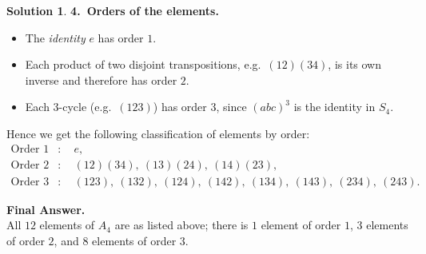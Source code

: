 \documentclass[12pt]{article}
\theoremstyle{definition} %
\newtheorem{solution}{Solution}
\theoremstyle{plain} %
\begin{document}
\begin{solution}
    \bigskip
    
    \noindent
    \textbf{4.\ Orders of the elements.}
    \begin{itemize}
    \item The \emph{identity} $e$ has order $1$.
    \item Each product of two disjoint transpositions, e.g.\ $(12)(34)$, is its own inverse and therefore has order $2$.
    \item Each 3-cycle (e.g.\ $(123)$) has order $3$, since $(abc)^3$ is the identity in $S_4$.
    \end{itemize}
    
    \noindent
    Hence we get the following classification of elements by order:
    \[
    \begin{aligned}
    \text{Order }1 &: \quad e,\\
    \text{Order }2 &: \quad (12)(34),\ (13)(24),\ (14)(23),\\
    \text{Order }3 &: \quad (123),\ (132),\ (124),\ (142),\ (134),\ (143),\ (234),\ (243).
    \end{aligned}
    \]
    
    \bigskip
    
    \noindent
    \textbf{Final Answer.}\\
    All $12$ elements of $A_4$ are as listed above; there is $1$ element of order $1$, $3$ elements of 
    order $2$, and $8$ elements of order $3$.
     
\end{solution}
\end{document}

